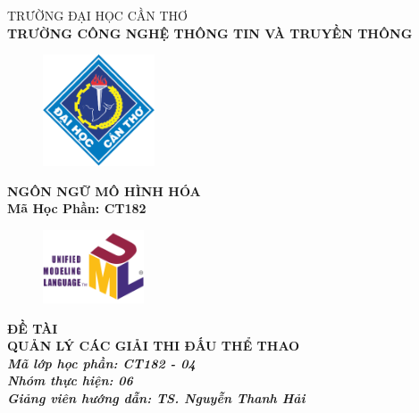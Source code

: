 \documentclass{article}
\begin{document}
\begin{titlepage}
    \begin{center}
        \vspace{-6pt}TRƯỜNG ĐẠI HỌC CẦN THƠ \\
        \textbf{\fontsize{14pt}{0pt}\selectfont TRƯỜNG CÔNG NGHỆ THÔNG TIN VÀ TRUYỀN THÔNG}
        \begin{figure}[H]
            \centering
            \includegraphics[width=3.3cm]{images/logo-ctu.png}
        \end{figure}
        \textbf{NGÔN NGỮ MÔ HÌNH HÓA} \\
        \textbf{Mã Học Phần: CT182}
        \begin{figure}[H]
            \centering
            \includegraphics[width=3cm]{images/logo-uml.png}
        \end{figure}
        \textbf{\fontsize{16pt}{0pt}\selectfont ĐỀ TÀI} \\
        \textbf{\fontsize{18pt}{0pt}\selectfont QUẢN LÝ CÁC GIẢI THI ĐẤU THỂ THAO} \\
        \vspace{0.5cm}
        \textbf{\textit{Mã lớp học phần: CT182 - 04}}\\
        \textbf{\textit{Nhóm thực hiện: 06}}\\
        \textbf{\textit{Giảng viên hướng dẫn: TS. Nguyễn Thanh Hải}}\\

\end{center}
\end{titlepage}
\end{document}

